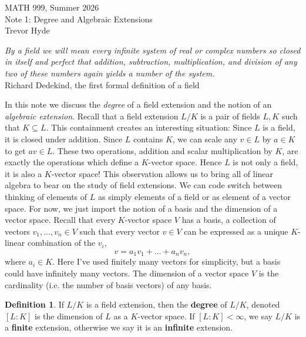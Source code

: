 \documentclass[11pt]{article}
\theoremstyle{definition}
\newtheorem{definition}[theorem]{Definition}
\numberwithin{equation}{subsection}
\newcommand{\head}[1]{
	\begin{center}
		{\large #1}
		\vspace{.05 in}
	\end{center}
	\bigskip 
}
\begin{document}
\pagestyle{plain}

\setcounter{section}{1}   

\head{MATH 999, Summer 2026\\ Note 1: Degree and Algebraic Extensions\\
Trevor Hyde}


\begin{center}
   \emph{By a field we will mean every infinite system of real or complex numbers so closed in itself and perfect that addition, subtraction, multiplication, and division of any two of these numbers again yields a number of the system.}\\
   \vspace{.1in}
   Richard Dedekind, the first formal definition of a field
\end{center}
\vspace{.1in}

In this note we discuss the \emph{degree} of a field extension and the notion of an \emph{algebraic extension}.
Recall that a field extension $L/K$ is a pair of fields $L, K$ such that $K \subseteq L$.
This containment creates an interesting situation: Since $L$ is a field, it is closed under addition. 
Since $L$ contains $K$, we can scale any $v \in L$ by $a \in K$ to get $av \in L$.
These two operations, addition and scalar multiplication by $K$, are exactly the operations which define a $K$-vector space.
Hence $L$ is not only a field, it is also a $K$-vector space!
This observation allows us to bring all of linear algebra to bear on the study of field extensions.
We can code switch between thinking of elements of $L$ as simply elements of a field or as element of a vector space.
For now, we just import the notion of a basis and the dimension of a vector space.
Recall that every $K$-vector space $V$ has a basis, a collection of vectors $v_1,\ldots, v_n \in V$ such that every vector $v \in V$ can be expressed as a unique $K$-linear combination of the $v_i$,
\[
    v = a_1v_1 + \ldots + a_nv_n,
\]
where $a_i \in K$.
Here I've used finitely many vectors for simplicity, but a basis could have infinitely many vectors.
The dimension of a vector space $V$ is the cardinality (i.e. the number of basis vectors) of any basis.

\begin{definition}
    If $L/K$ is a field extension, then the \textbf{degree} of $L/K$, denoted $[L : K]$ is the dimension of $L$ as a $K$-vector space.
    If $[L : K] < \infty$, we say $L/K$ is a \textbf{finite} extension, otherwise we say it is an \textbf{infinite} extension.
\end{definition}
\end{document}
